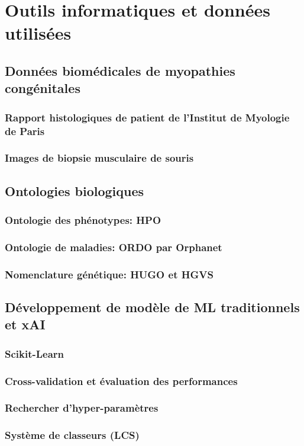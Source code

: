 \chapter{Outils informatiques et données utilisées}
\section{Données biomédicales de myopathies congénitales}
\subsection{Rapport histologiques de patient de l'Institut de Myologie de Paris}
\subsection{Images de biopsie musculaire de souris}
\section{Ontologies biologiques}
\subsection{Ontologie des phénotypes: HPO}
\subsection{Ontologie de maladies: ORDO par Orphanet}
\subsection{Nomenclature génétique: HUGO et HGVS}
\section{Développement de modèle de ML traditionnels et xAI}
\subsection{Scikit-Learn}
\subsection{Cross-validation et évaluation des performances}
\subsection{Rechercher d'hyper-paramètres}
\subsection{Système de classeurs (LCS)}
